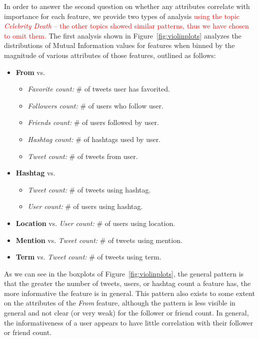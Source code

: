 In order to answer the second question on whether any attributes
correlate with importance for each feature, we provide two types of
analysis \textcolor{red}{using the topic \textit{Celebrity Death} -- 
the other topics showed similar patterns, thus we have chosen to omit them.} 
The first analysis shown in Figure~\ref{fig:violinplots}
analyzes the distributions of Mutual Information values for features
when binned by the magnitude of various attributes of those
features, outlined as follows:
\begin{itemize}
\item \textbf{From} vs. 
\begin{itemize}
\item \textit{Favorite count:} \# of tweets user has favorited.
\item \textit{Followers count:} \# of users who follow user.
\item \textit{Friends count:} \# of users followed by user.
\item \textit{Hashtag count:} \# of hashtags used by user.
\item \textit{Tweet count:} \# of tweets from user.
 \end{itemize}
\end{itemize}
\begin{itemize}
\item \textbf{Hashtag} vs.
\begin{itemize}
\item \textit{Tweet count:} \# of tweets using hashtag.
\item \textit{User count:} \# of users using hashtag.
\end{itemize}
\end{itemize}
\begin{itemize}
\item \textbf{Location} vs. \textit{User count:} \# of users using location.
\item \textbf{Mention} vs. \textit{Tweet count:} \# of tweets using mention.
\item \textbf{Term} vs. \textit{Tweet count:} \# of tweets using term.
\end{itemize}

As we can see in the boxplots of Figure~\ref{fig:violinplots}, the
general pattern is that the greater the number of tweets, users, or
hashtag count a feature has, the more informative the feature is in general.
This pattern also exists to some extent on the attributes
of the \textit{From} feature, although the pattern is less visible in
general and not clear (or very weak) for the follower or friend count.
In general, the informativeness of a user appears to have little correlation
with their follower or friend count.

